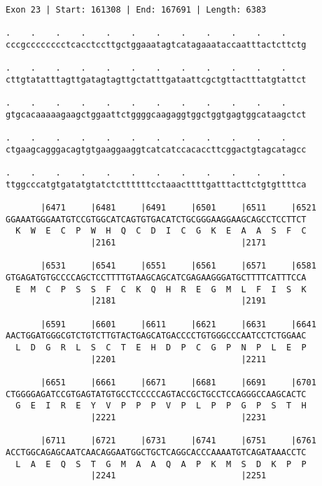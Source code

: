 \documentclass{article}
\begin{document}
\newpage
\begin{Verbatim}[fontfamily=courier]
Exon 23 | Start: 161308 | End: 167691 | Length: 6383

.    .    .    .    .    .    .    .    .    .    .    .    
cccgcccccccctcacctccttgctggaaatagtcatagaaataccaatttactcttctg

.    .    .    .    .    .    .    .    .    .    .    .    
cttgtatatttagttgatagtagttgctatttgataattcgctgttactttatgtattct

.    .    .    .    .    .    .    .    .    .    .    .    
gtgcacaaaaagaagctggaattctggggcaagaggtggctggtgagtggcataagctct

.    .    .    .    .    .    .    .    .    .    .    .    
ctgaagcagggacagtgtgaaggaaggtcatcatccacaccttcggactgtagcatagcc

.    .    .    .    .    .    .    .    .    .    .    .    
ttggcccatgtgatatgtatctcttttttcctaaacttttgatttacttctgtgttttca

       |6471     |6481     |6491     |6501     |6511     |6521
GGAAATGGGAATGTCCGTGGCATCAGTGTGACATCTGCGGGAAGGAAGCAGCCTCCTTCT
  K  W  E  C  P  W  H  Q  C  D  I  C  G  K  E  A  A  S  F  C
                 |2161                         |2171        

       |6531     |6541     |6551     |6561     |6571     |6581
GTGAGATGTGCCCCAGCTCCTTTTGTAAGCAGCATCGAGAAGGGATGCTTTTCATTTCCA
  E  M  C  P  S  S  F  C  K  Q  H  R  E  G  M  L  F  I  S  K
                 |2181                         |2191        

       |6591     |6601     |6611     |6621     |6631     |6641
AACTGGATGGGCGTCTGTCTTGTACTGAGCATGACCCCTGTGGGCCCAATCCTCTGGAAC
  L  D  G  R  L  S  C  T  E  H  D  P  C  G  P  N  P  L  E  P
                 |2201                         |2211        

       |6651     |6661     |6671     |6681     |6691     |6701
CTGGGGAGATCCGTGAGTATGTGCCTCCCCCAGTACCGCTGCCTCCAGGGCCAAGCACTC
  G  E  I  R  E  Y  V  P  P  P  V  P  L  P  P  G  P  S  T  H
                 |2221                         |2231        

       |6711     |6721     |6731     |6741     |6751     |6761
ACCTGGCAGAGCAATCAACAGGAATGGCTGCTCAGGCACCCAAAATGTCAGATAAACCTC
  L  A  E  Q  S  T  G  M  A  A  Q  A  P  K  M  S  D  K  P  P
                 |2241                         |2251        

\end{Verbatim}
\newpage
\end{document}
